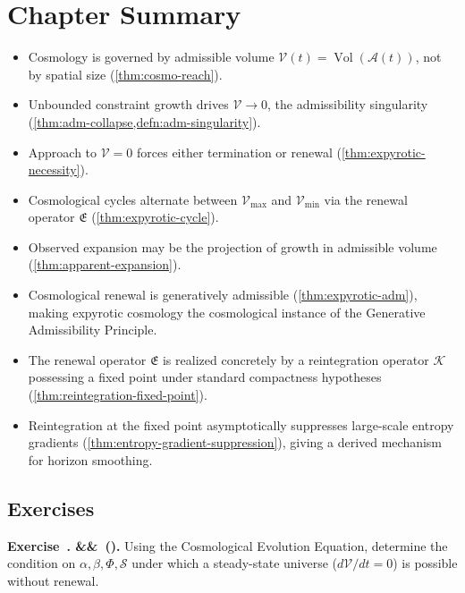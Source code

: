 \documentclass[12pt,twoside,openright]{book}
\newcommand{\Vol}{\operatorname{Vol}}
\newenvironment{chapsummary}{%
  \begin{tcolorbox}[colback=DistBlue!5,colframe=DistBlue,
    title={\faBookOpen\enspace Summary},
    fonttitle=\sffamily\bfseries\color{white},
    attach boxed title to top left={yshift=-2mm,xshift=4mm},
    boxed title style={colback=DistBlue,rounded corners}]
  \begin{itemize}[nosep,leftmargin=*]}{%
  \end{itemize}\end{tcolorbox}}
\newcounter{exercise}[chapter]
\newenvironment{exercise}[1][]{%
  \refstepcounter{exercise}%
  \noindent\textbf{\sffamily\color{DistBlue}%
  Exercise~\thechapter.\theexercise%
  \ifx&#1&\else~(#1)\fi.}\enspace}{\par\medskip}
\begin{document}
\section*{Chapter Summary}
\begin{chapsummary}
  \item Cosmology is governed by admissible volume
        $\mathcal{V}(t) = \Vol(\mathcal{A}(t))$, not by
        spatial size (\cref{thm:cosmo-reach}).
  \item Unbounded constraint growth drives
        $\mathcal{V} \to 0$, the admissibility singularity
        (\cref{thm:adm-collapse,defn:adm-singularity}).
  \item Approach to $\mathcal{V} = 0$ forces either
        termination or renewal
        (\cref{thm:expyrotic-necessity}).
  \item Cosmological cycles alternate between
        $\mathcal{V}_{\max}$ and $\mathcal{V}_{\min}$ via
        the renewal operator $\mathfrak{E}$
        (\cref{thm:expyrotic-cycle}).
  \item Observed expansion may be the projection of growth
        in admissible volume
        (\cref{thm:apparent-expansion}).
  \item Cosmological renewal is generatively admissible
        (\cref{thm:expyrotic-adm}), making expyrotic
        cosmology the cosmological instance of the
        Generative Admissibility Principle.
  \item The renewal operator $\mathfrak{E}$ is realized
        concretely by a reintegration operator $\mathcal{K}$
        possessing a fixed point under standard compactness
        hypotheses (\cref{thm:reintegration-fixed-point}).
  \item Reintegration at the fixed point asymptotically
        suppresses large-scale entropy gradients
        (\cref{thm:entropy-gradient-suppression}), giving a
        derived mechanism for horizon smoothing.
\end{chapsummary}

\subsection*{Exercises}

\begin{exercise}
  Using the Cosmological Evolution Equation, determine the
  condition on $\alpha, \beta, \Phi, \mathcal{S}$ under
  which a steady-state universe ($d\mathcal{V}/dt = 0$) is
  possible without renewal.
\end{exercise}
\end{document}
